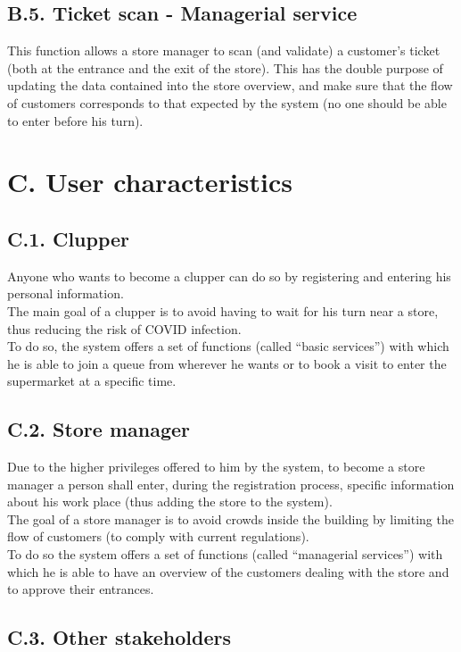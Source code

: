 \subsection{B.5. Ticket scan - Managerial service}

This function allows a store manager to scan (and validate) a customer's ticket (both at the entrance and the exit of the store). This has the double purpose of updating the data contained into the store overview, and make sure that the flow of customers corresponds to that expected by the system (no one should be able to enter before his turn).

\section{C. User characteristics}

\subsection{C.1. Clupper}

Anyone who wants to become a clupper can do so by registering and entering his personal information.\\
The main goal of a clupper is to avoid having to wait for his turn near a store, thus reducing the risk of COVID infection.\\
To do so, the system offers a set of functions (called ``basic services'') with which he is able to join a queue from wherever he wants or to book a visit to enter the supermarket at a specific time.

\subsection{C.2. Store manager}

Due to the higher privileges offered to him by the system, to become a store manager a person shall enter, during the registration process, specific information about his work place (thus adding the store to the system).\\
The goal of a store manager is to avoid crowds inside the building by limiting the flow of customers (to comply with current regulations).\\
To do so the system offers a set of functions (called ``managerial services'') with which he is able to have an overview of the customers dealing with the store and to approve their entrances.

\subsection{C.3. Other stakeholders}

